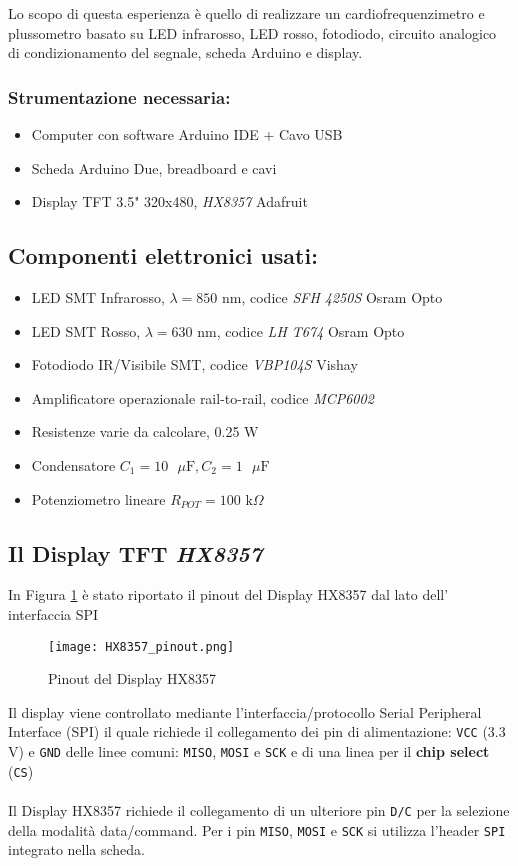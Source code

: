 Lo scopo di questa esperienza è quello di realizzare un cardiofrequenzimetro e plussometro basato su LED infrarosso, LED rosso, fotodiodo, circuito analogico di condizionamento del segnale, scheda Arduino e display.
\subsubsection*{Strumentazione necessaria:}
\begin{itemize}
    \item Computer con software Arduino IDE + Cavo USB
    \item Scheda Arduino Due, breadboard e cavi
    \item Display TFT 3.5" 320x480, \textit{HX8357} Adafruit
\end{itemize}
\subsection{Componenti elettronici usati:}
\begin{itemize}
    \item LED SMT Infrarosso, $\lambda=850$ nm, codice \textit{SFH 4250S} Osram Opto
    \item LED SMT Rosso, $\lambda=630$ nm, codice \textit{LH T674} Osram Opto
    \item Fotodiodo IR/Visibile SMT, codice \textit{VBP104S} Vishay
    \item Amplificatore operazionale rail-to-rail, codice \textit{MCP6002}
    \item Resistenze varie da calcolare, 0.25 W
    \item Condensatore $C_1=10\text{ }\mu\text{F},C_2=1\text{ }\mu\text{F}$
    \item Potenziometro lineare $R_{POT}=100\text{ k}\Omega$
\end{itemize}
\subsection{Il Display TFT \textit{HX8357}}
In Figura \ref{fig:HX8357_pinout} è stato riportato il pinout del Display HX8357 dal lato dell' interfaccia SPI
\begin{figure}[H]
    \centering
    \texttt{[image: HX8357\_pinout.png]}
    \caption{Pinout del Display HX8357}
    \label{fig:HX8357_pinout}
\end{figure}
\noindent Il display viene controllato mediante l'interfaccia/protocollo Serial Peripheral Interface (SPI) il quale richiede il collegamento dei pin di alimentazione: \texttt{VCC} ($3.3$V) e \texttt{GND} delle linee comuni: \texttt{MISO}, \texttt{MOSI} e \texttt{SCK} e di una linea per il \textbf{chip select} (\texttt{CS})\\\\
Il Display HX8357 richiede il collegamento di un ulteriore pin \texttt{D/C} per la selezione della modalità data/command. Per i pin \texttt{MISO}, \texttt{MOSI} e \texttt{SCK} si utilizza l'header \texttt{SPI} integrato nella scheda.